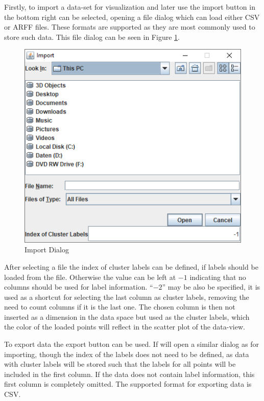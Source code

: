 \documentclass[
	a4paper,
	english,
	twoside,
	openright,               
	11pt                            
	]{report}
\begin{document}
 Firstly, to import a data-set for visualization and later use the import button in the bottom right can be selected, opening a file dialog which can load either CSV or ARFF files. These formats are supported as they are most commonly used to store such data. This file dialog can be seen in Figure \ref{fig:data-import}. 

\begin{figure}[h]
	\centering 
	\includegraphics[scale=.45]{data-import}%
	\caption{Import Dialog}
	\label{fig:data-import}
\end{figure}

After selecting a file the index of cluster labels can be defined, if labels should be loaded from the file. Otherwise the value can be left at $-1$ indicating that no columns should be used for label information. ``$-2$'' may be also be specified, it is used as a shortcut for selecting the last column as cluster labels, removing the need to count columns if it is the last one. The chosen column is then not inserted as a dimension in the data space but used as the cluster labels, which the color of the loaded points will reflect in the scatter plot of the data-view. 

To export data the export button can be used. If will open a similar dialog as for importing, though the index of the labels does not need to be defined, as data with cluster labels will be stored such that the labels for all points will be included in the first column. If the data does not contain label information, this first column is completely omitted. The supported format for exporting data is CSV.
\end{document}
